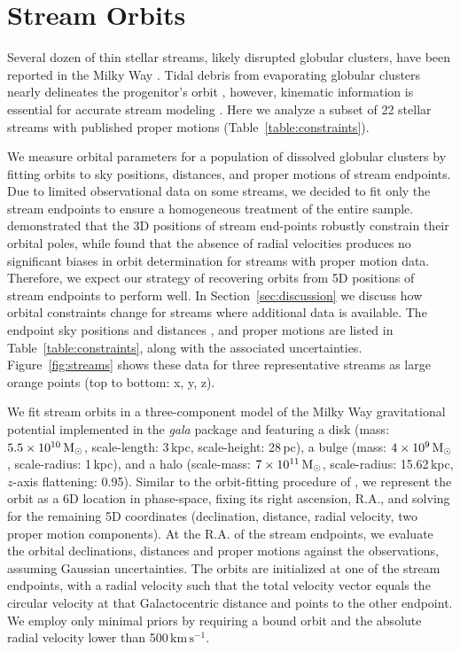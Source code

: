 \documentclass[twocolumn]{aastex63}
\newcommand{\package}[1]{\textsl{#1}}
\newcommand{\kms}{\ensuremath{\textrm{km}\,\textrm{s}^{-1}}}
\begin{document}
\section{Stream Orbits}
\label{sec:orbits}
Several dozen of thin stellar streams, likely disrupted globular clusters, have been reported in the Milky Way \citep[an up-to-date list is available in the \package{galstreams} package,][]{mateu:2018}.
Tidal debris from evaporating globular clusters nearly delineates the progenitor's orbit \citep[e.g.,][]{kupper:2012}, however, kinematic information is essential for accurate stream modeling \citep{bh:2018}.
Here we analyze a subset of 22 stellar streams with published proper motions (Table~\ref{table:constraints}).

We measure orbital parameters for a population of dissolved globular clusters by fitting orbits to sky positions, distances, and proper motions of stream endpoints.
Due to limited observational data on some streams, we decided to fit only the stream endpoints to ensure a homogeneous treatment of the entire sample.
\citet{riley:2020} demonstrated that the 3D positions of stream end-points robustly constrain their orbital poles, while \citet{ibata:2019} found that the absence of radial velocities produces no significant biases in orbit determination for streams with proper motion data.
Therefore, we expect our strategy of recovering orbits from 5D positions of stream endpoints to perform well.
In Section~\ref{sec:discussion} we discuss how orbital constraints change for streams where additional data is available.
The endpoint sky positions and distances \citep{riley:2020}, and proper motions \citep[][as noted]{ibata:2019, shipp:2019} are listed in Table~\ref{table:constraints}, along with the associated uncertainties.
Figure~\ref{fig:streams} shows these data for three representative streams as large orange points (top to bottom: x, y, z).

We fit stream orbits in a three-component model of the Milky Way gravitational potential implemented in the \package{gala} package \citep{gala} and featuring a \citet{mn:1975} disk (mass: $5.5\times10^{10}\rm\, M_\odot$, scale-length: 3\,kpc, scale-height: 28\,pc), a \citet{hernquist:1990} bulge (mass: $4\times10^9\rm\, M_\odot$, scale-radius: 1\,kpc), and a \citet{nfw:1997} halo (scale-mass: $7\times10^{11}\rm\, M_\odot$, scale-radius: 15.62\,kpc, $z$-axis flattening: 0.95).
Similar to the orbit-fitting procedure of \citet{pwb}, we represent the orbit as a 6D location in phase-space, fixing its right ascension, R.A., and solving for the remaining 5D coordinates (declination, distance, radial velocity, two proper motion components).
At the R.A. of the stream endpoints, we evaluate the orbital declinations, distances and proper motions against the observations, assuming Gaussian uncertainties.
The orbits are initialized at one of the stream endpoints, with a radial velocity such that the total velocity vector equals the circular velocity at that Galactocentric distance and points to the other endpoint.
We employ only minimal priors by requiring a bound orbit and the absolute radial velocity lower than 500\,\kms.
\end{document}
